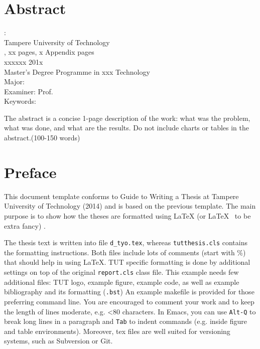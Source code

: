 \documentclass[12pt,a4paper,english%
]{tutthesis}
\begin{document}
\chapter*{Abstract}
\begin{spacing}{1.0}
         {\bf \textsf{\MakeUppercase{\@author}}}: \@title\\   %
         \textsf{Tampere University of Technology}\\
         \textsf{\@thesistype, xx pages, x Appendix pages} \\
         \textsf{xxxxxx 201x}\\
         \textsf{Master's Degree Programme in xxx Technology}\\
         \textsf{Major: }\\
         \textsf{Examiner: Prof. \@examiner}\\ %
         \textsf{Keywords: }\\
\end{spacing}

The abstract is a concise 1-page description of the work: what was the
problem, what was done, and what are the results. Do not include
charts or tables in the abstract.(100-150 words)



\makeatother %
\chapter*{Preface}
This document template conforms to Guide to Writing a Thesis at
Tampere University of Technology (2014) and is based on the previous
template. The main purpose is to show how the theses are formatted
using LaTeX (or \LaTeX ~ to be extra fancy) .

The thesis text is written into file \texttt{d\_tyo.tex}, whereas
\texttt{tutthesis.cls} contains the formatting instructions. Both
files include lots of comments (start with \%) that should help in
using LaTeX. TUT specific formatting is done by additional settings on
top of the original \texttt{report.cls} class file. This example needs
few additional files: TUT logo, example figure, example code, as well
as example bibliography and its formatting (\texttt{.bst}) An example
makefile is provided for those preferring command line. You are
encouraged to comment your work and to keep the length of lines
moderate, e.g. <80 characters. In Emacs, you can use \texttt{Alt-Q} to
break long lines in a paragraph and \texttt{Tab} to indent commands
(e.g. inside figure and table environments). Moreover, tex files are
well suited for versioning systems, such as Subversion or Git.  
\end{document}
